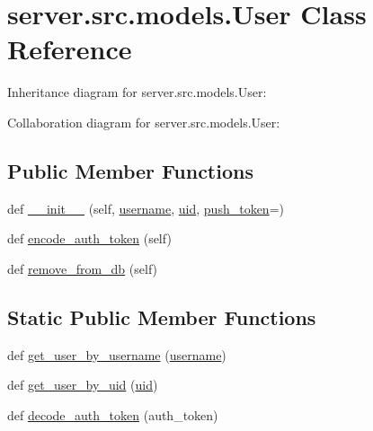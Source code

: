 \hypertarget{classserver_1_1src_1_1models_1_1_user}{}\section{server.\+src.\+models.\+User Class Reference}
\label{classserver_1_1src_1_1models_1_1_user}


Inheritance diagram for server.\+src.\+models.\+User\+:


Collaboration diagram for server.\+src.\+models.\+User\+:
\subsection*{Public Member Functions}
\begin{DoxyCompactItemize}
\item 
def \hyperlink{classserver_1_1src_1_1models_1_1_user_ae7810ed5869ba91aaece31d8a8a12406}{\+\_\+\+\_\+init\+\_\+\+\_\+} (self, \hyperlink{classserver_1_1src_1_1models_1_1_user_acb75051a64b473f00340abd8d8cd379a}{username}, \hyperlink{classserver_1_1src_1_1models_1_1_user_a9a4d7dce0947f4e81278a993244fb3e7}{uid}, \hyperlink{classserver_1_1src_1_1models_1_1_user_ab6574a566e1351de30f59603fcb5f087}{push\+\_\+token}=\textquotesingle{}\textquotesingle{})
\item 
def \hyperlink{classserver_1_1src_1_1models_1_1_user_afe0ff6d68b9cd0018b148105f7eaa670}{encode\+\_\+auth\+\_\+token} (self)
\item 
def \hyperlink{classserver_1_1src_1_1models_1_1_user_a4f935c1ffff6886e4fed9a007550420d}{remove\+\_\+from\+\_\+db} (self)
\end{DoxyCompactItemize}
\subsection*{Static Public Member Functions}
\begin{DoxyCompactItemize}
\item 
def \hyperlink{classserver_1_1src_1_1models_1_1_user_aadaa85113e78dda0f8d043b25a833f4e}{get\+\_\+user\+\_\+by\+\_\+username} (\hyperlink{classserver_1_1src_1_1models_1_1_user_acb75051a64b473f00340abd8d8cd379a}{username})
\item 
def \hyperlink{classserver_1_1src_1_1models_1_1_user_a9dc609228ed203a670fc27853c11e1e9}{get\+\_\+user\+\_\+by\+\_\+uid} (\hyperlink{classserver_1_1src_1_1models_1_1_user_a9a4d7dce0947f4e81278a993244fb3e7}{uid})
\item 
def \hyperlink{classserver_1_1src_1_1models_1_1_user_a2c6b2817ce55a8d86e3dfc26d590f727}{decode\+\_\+auth\+\_\+token} (auth\+\_\+token)
\end{DoxyCompactItemize}

